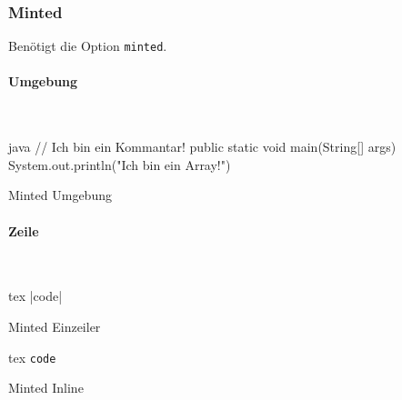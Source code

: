 \newpage
\subsubsection{Minted}
Benötigt die Option \texttt{minted}.
\paragraph{Umgebung}~\\
\begin{listing}
\ifminted   {}
\else       {}\fi
\begin{code}[firstnumber=last]{java}
// Ich bin ein Kommantar!
public static void main(String[] args) {
    System.out.println("Ich bin ein Array!")
}
\end{code}
\ifminted   {}
\else       {}\fi
\caption{Minted Umgebung}
\label{lst:minted-env}
\end{listing}

\paragraph{Zeile}~\\
\begin{listing}
\begin{code}{tex}
|code|
\end{code}
\caption{Minted Einzeiler}
\label{lst:minted-line}
\end{listing}

\begin{listing}
\begin{code}{tex}
\texttt{code}
\end{code}
\caption{Minted Inline}
\label{lst:minted-inline}
\end{listing}